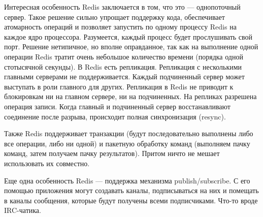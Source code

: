 Интересная особенность Redis заключается в том, что это — однопоточный сервер. Такое решение сильно упрощает поддержку кода, обеспечивает атомарность операций и позволяет запустить по одному процессу Redis на каждое ядро процессора. Разумеется, каждый процесс будет прослушивать свой порт. Решение нетипичное, но вполне оправданное, так как на выполнение одной операции Redis тратит очень небольшое количество времени (порядка одной стотысячной секунды).
В Redis есть репликация. Репликация с несколькими главными серверами не поддерживается. Каждый подчиненный сервер может выступать в роли главного для других. Репликация в Redis не приводит к блокировкам ни на главном сервере, ни на подчиненных. На репликах разрешена операция записи. Когда главный и подчиненный сервер восстанавливают соединение после разрыва, происходит полная синхронизация (resync).

Также Redis поддерживает транзакции (будут последовательно выполнены либо все операции, либо ни одной) и пакетную обработку команд (выполняем пачку команд, затем получаем пачку результатов). Притом ничто не мешает использовать их совместно.

Еще одна особенность Redis — поддержка механизма publish/subscribe. С его помощью приложения могут создавать каналы, подписываться на них и помещать в каналы сообщения, которые будут получены всеми подписчиками. Что-то вроде IRC-чатика.